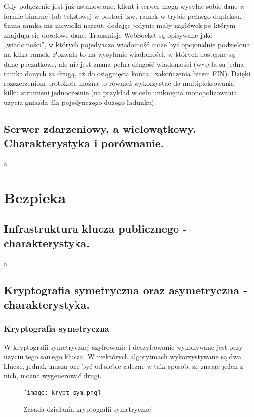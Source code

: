 \documentclass[a4paper,12pt,oneside]{book}
\begin{document}
			Gdy połączenie jest już ustanowione, klient i serwer mogą wysyłać sobie dane w formie binarnej lub tekstowej w postaci tzw. ramek w trybie pełnego dupleksu. Sama ramka ma niewielki narzut, dodając jedynie mały nagłówek po którym znajdują się docelowe dane. Transmisje WebSocket są opisywane jako „wiadomości”, w których pojedyncza wiadomość może być opcjonalnie podzielona na kilka ramek. Pozwala to na wysyłanie wiadomości, w których dostępne są dane początkowe, ale nie jest znana pełna długość wiadomości (wysyła są jedna ramka danych za drugą, aż do osiągnięcia końca i zakończenia bitem FIN). Dzięki rozszerzeniom protokołu można to również wykorzystać do multipleksowania kilku strumieni jednocześnie (na przykład w celu uniknięcia monopolizowania użycia gniazda dla pojedynczego dużego ładunku).
		
		
			\newpage\subsection{\color{red}Serwer zdarzeniowy, a wielowątkowy. Charakterystyka i porównanie.}
				a
		
		\newpage\section{Bezpieka}
			\subsection{\color{red}Infrastruktura klucza publicznego - charakterystyka.}
				a
			
			\newpage\subsection{Kryptografia symetryczna oraz asymetryczna - charakterystyka.}
				
				\subsubsection*{Kryptografia symetryczna}
				
				W kryptografii symetrycznej szyfrowanie i deszyfrowanie wykonywane jest przy użyciu tego samego klucza. W niektórych algorytmach wykorzystywane są dwa klucze, jednak muszą one być od siebie zależne w taki sposób, że znając jeden z nich, można wygenerować drugi.
				
				\begin{figure}[h!]
					\centering\texttt{[image: krypt\_sym.png]}
					\caption{Zasada działania kryptografii symetrycznej}
				\end{figure}
				
\end{document}
